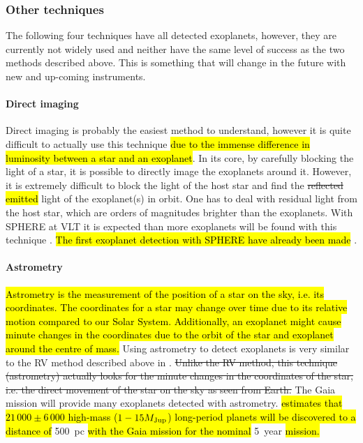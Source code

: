 \subsubsection{Other techniques}

The following four techniques have all detected exoplanets, however, they are currently not widely
used and neither have the same level of success as the two methods described above. This is
something that will change in the future with new and up-coming instruments.

\paragraph{Direct imaging}

Direct imaging is probably the easiest method to understand, however it is quite difficult to
actually use this technique \hl{due to the immense difference in luminosity between a star and an
exoplanet}. In its core, by carefully blocking the light of a star, it is possible to directly image
the exoplanets around it. However, it is extremely difficult to block the light of the host star and
find the \st{reflected} \hl{emitted} light of the exoplanet(s) in orbit. One has to deal with
residual light from the host star, which are orders of magnitudes brighter than the exoplanets. With
SPHERE at VLT it is expected than more exoplanets will be found with this technique
\citep{Beuzit2008}. \hl{The first exoplanet detection with SPHERE have already been made} \citep[see
e.g.]{Vigan2016,Bonnefoy2016,Apai2016,Maire2016,Zurlo2016}.


\paragraph{Astrometry}

\hl{Astrometry is the measurement of the position of a star on the sky, i.e. its coordinates. The
coordinates for a star may change over time due to its relative motion compared to our Solar System.
Additionally, an exoplanet might cause minute changes in the coordinates due to the orbit of the
star and exoplanet around the centre of mass.} Using astrometry to detect exoplanets is very similar
to the RV method described above in . \st{Unlike the RV method, this technique
(astrometry) actually looks for the minute changes in the coordinates of the star, i.e. the direct
movement of the star on the sky as seen from Earth.} The Gaia mission \citep{GAIA} will provide many
exoplanets detected with astrometry. \citet{Perryman2014} \hl{estimates that $21\,000\pm6\,000$
high-mass ($1-15M_\mathrm{Jup}$) long-period planets will be discovered to a distance of} \SI{500}{pc}
\hl{with the Gaia mission for the nominal} \SI{5}{year} \hl{mission.}

